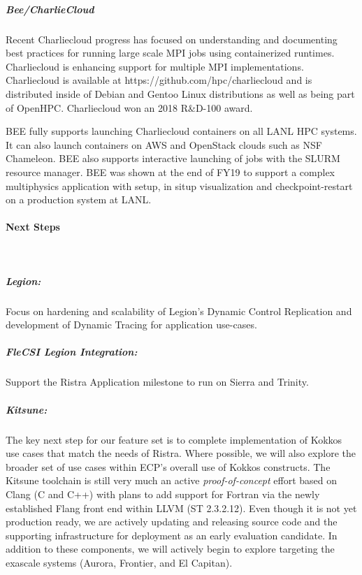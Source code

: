 \subparagraph{Bee/CharlieCloud}
%
Recent Charliecloud progress has focused on understanding and documenting best
practices for running large scale MPI jobs using containerized runtimes.
Charliecloud is enhancing support for multiple MPI implementations.
Charliecloud is available at https://github.com/hpc/charliecloud and is
distributed inside of Debian and Gentoo Linux distributions as well as being
part of OpenHPC.  Charliecloud won an 2018 R\&D-100 award.

BEE fully supports launching Charliecloud containers on all LANL HPC systems.
It can also launch containers on AWS and OpenStack clouds such as NSF
Chameleon.  BEE also supports interactive launching of jobs with the SLURM
resource manager. BEE was shown at the end of FY19 to support a complex multiphysics application with setup, in situp visualization and checkpoint-restart on a production system at LANL.

\paragraph{Next Steps} \leavevmode \\

\subparagraph{Legion:} 
Focus on hardening and scalability of Legion's Dynamic Control Replication and development of Dynamic Tracing for application use-cases. 

\subparagraph{FleCSI Legion Integration:} 
Support the Ristra Application milestone to run on Sierra and Trinity.

\subparagraph{Kitsune:}
The key next step for our feature set is to complete implementation of Kokkos use cases 
that match the needs of Ristra.  Where possible, we will also
explore the broader set of use cases within ECP's overall use of
Kokkos constructs.  The Kitsune toolchain is still very much an
active \emph{proof-of-concept} effort based on Clang (C and C++) with
plans to add support for Fortran via the newly established Flang front
end within LLVM (ST 2.3.2.12).  Even though it is not yet production
ready, we are actively updating and releasing source code and the supporting
infrastructure for deployment as an early evaluation candidate.  In
addition to these components, we will actively begin to explore targeting
the exascale systems (Aurora, Frontier, and El Capitan).


